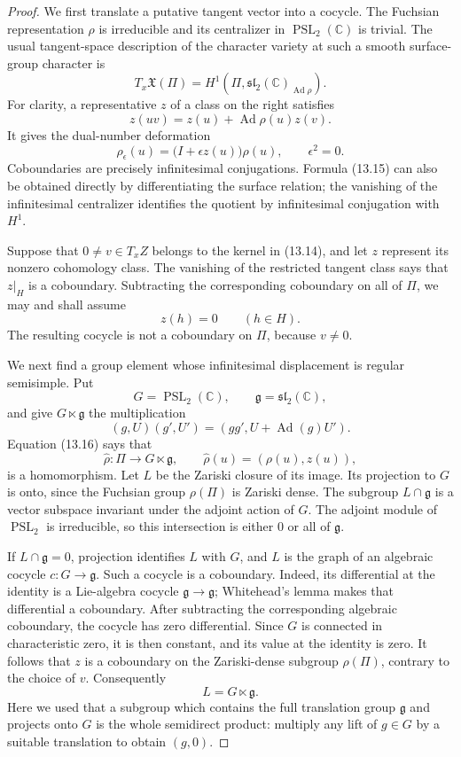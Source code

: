 \documentclass[11pt,reqno]{amsart}
\theoremstyle{definition}
\theoremstyle{remark}
\newcommand{\C}{\mathbb C}
\newcommand{\PSL}{\operatorname{PSL}}
\newcommand{\Ad}{\operatorname{Ad}}
\begin{document}
\begin{proof}
We first translate a putative tangent vector into a cocycle.  The Fuchsian
representation \(\rho\) is irreducible and its centralizer in
\(\PSL_2(\C)\) is trivial.  The usual tangent-space description of the
character variety at such a smooth surface-group character is
\[
 T_x\mathfrak X(\Pi)=
 H^1\!\left(\Pi,\mathfrak{sl}_2(\C)_{\Ad\rho}\right).
\tag{13.15}
\]
For clarity, a representative \(z\) of a class on the right satisfies
\[
 z(uv)=z(u)+\Ad\rho(u)z(v).
\tag{13.16}
\]
It gives the dual-number deformation
\[
 \rho_\epsilon(u)=
 \bigl(I+\epsilon z(u)\bigr)\rho(u),
 \qquad \epsilon^2=0.
\tag{13.17}
\]
Coboundaries are precisely infinitesimal conjugations.  Formula (13.15)
can also be obtained directly by differentiating the surface relation; the
vanishing of the infinitesimal centralizer identifies the quotient by
infinitesimal conjugation with \(H^1\).

Suppose that \(0\ne v\in T_xZ\) belongs to the kernel in (13.14), and let
\(z\) represent its nonzero cohomology class.  The vanishing of the
restricted tangent class says that \(z|_H\) is a coboundary.  Subtracting
the corresponding coboundary on all of \(\Pi\), we may and shall assume
\[
 z(h)=0\qquad(h\in H).
\tag{13.18}
\]
The resulting cocycle is not a coboundary on \(\Pi\), because \(v\ne0\).

We next find a group element whose infinitesimal displacement is regular
semisimple.  Put
\[
 G=\PSL_2(\C),\qquad \mathfrak g=\mathfrak{sl}_2(\C),
\]
and give \(G\ltimes\mathfrak g\) the multiplication
\[
 (g,U)(g',U')=(gg',U+\Ad(g)U').
\]
Equation (13.16) says that
\[
 \widehat\rho\colon\Pi\longrightarrow G\ltimes\mathfrak g,
 \qquad
 \widehat\rho(u)=(\rho(u),z(u)),
\tag{13.19}
\]
is a homomorphism.  Let \(L\) be the Zariski closure of its image.  Its
projection to \(G\) is onto, since the Fuchsian group \(\rho(\Pi)\) is
Zariski dense.  The subgroup
\(L\cap\mathfrak g\) is a vector subspace invariant under the adjoint
action of \(G\).  The adjoint module of \(\PSL_2\) is irreducible, so this
intersection is either \(0\) or all of \(\mathfrak g\).

If \(L\cap\mathfrak g=0\), projection identifies \(L\) with \(G\), and
\(L\) is the graph of an algebraic cocycle
\(c\colon G\to\mathfrak g\).  Such a cocycle is a coboundary.  Indeed, its
differential at the identity is a Lie-algebra cocycle
\(\mathfrak g\to\mathfrak g\); Whitehead's lemma makes that differential a
coboundary.  After subtracting the corresponding algebraic coboundary, the
cocycle has zero differential.  Since \(G\) is connected in characteristic
zero, it is then constant, and its value at the identity is zero.  It
follows that \(z\) is a coboundary on the Zariski-dense subgroup
\(\rho(\Pi)\), contrary to the choice of \(v\).  Consequently
\[
 L=G\ltimes\mathfrak g.
\tag{13.20}
\]
Here we used that a subgroup which contains the full translation group
\(\mathfrak g\) and projects onto \(G\) is the whole semidirect product:
multiply any lift of \(g\in G\) by a suitable translation to obtain
\((g,0)\).


\end{proof}
\end{document}
